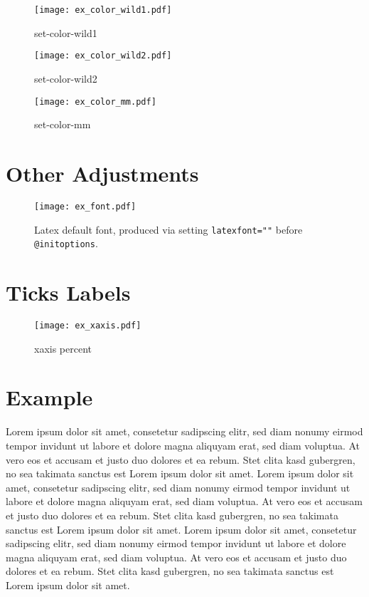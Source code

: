 \documentclass[twocolumn,floatfix]{revtex4-1}
\begin{document}
\begin{figure}[h]
\centering
\texttt{[image: ex\_color\_wild1.pdf]}
\caption{set-color-wild1}
\end{figure}

\begin{figure}[h]
\centering
\texttt{[image: ex\_color\_wild2.pdf]}
\caption{set-color-wild2}
\end{figure}

\begin{figure}[h]
\centering
\texttt{[image: ex\_color\_mm.pdf]}
\caption{set-color-mm}
\end{figure}

\section{Other Adjustments}



\begin{figure}[h]
\centering
\texttt{[image: ex\_font.pdf]}
\caption{Latex default font, produced via setting \texttt{latex\textunderscore font=""} before \texttt{@init\textunderscore options}.}
\end{figure}

\section{Ticks Labels}

\begin{figure}[h]
\centering
\texttt{[image: ex\_xaxis.pdf]}
\caption{xaxis percent}
\end{figure}

\clearpage
\section{Example}

Lorem ipsum dolor sit amet, consetetur sadipscing elitr, sed diam nonumy eirmod tempor invidunt ut labore et dolore magna aliquyam erat, sed diam voluptua. At vero eos et accusam et justo duo dolores et ea rebum. Stet clita kasd gubergren, no sea takimata sanctus est Lorem ipsum dolor sit amet. Lorem ipsum dolor sit amet, consetetur sadipscing elitr, sed diam nonumy eirmod tempor invidunt ut labore et dolore magna aliquyam erat, sed diam voluptua. At vero eos et accusam et justo duo dolores et ea rebum. Stet clita kasd gubergren, no sea takimata sanctus est Lorem ipsum dolor sit amet. Lorem ipsum dolor sit amet, consetetur sadipscing elitr, sed diam nonumy eirmod tempor invidunt ut labore et dolore magna aliquyam erat, sed diam voluptua. At vero eos et accusam et justo duo dolores et ea rebum. Stet clita kasd gubergren, no sea takimata sanctus est Lorem ipsum dolor sit amet. 
\end{document}
